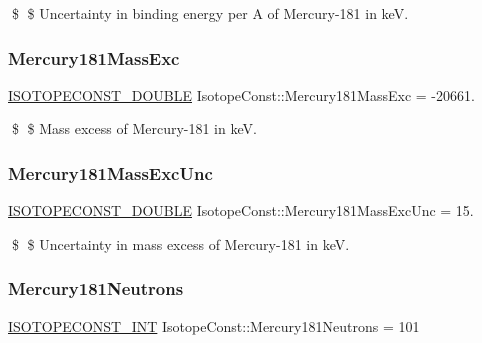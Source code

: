 \$ \$ Uncertainty in binding energy per A of Mercury-\/181 in keV. \mbox{\label{group___isotope_const-_mercury-_hg181_ga95e3cd076af0f7a54449aa435fa737fd}} 
\subsubsection{\texorpdfstring{Mercury181\+Mass\+Exc}{Mercury181MassExc}}
{\footnotesize\ttfamily \mbox{\hyperlink{group___isotope_const-_macros_ga8f45a7272ce02c0b4c65c44636ed719a}{I\+S\+O\+T\+O\+P\+E\+C\+O\+N\+S\+T\+\_\+\+D\+O\+U\+B\+LE}} Isotope\+Const\+::\+Mercury181\+Mass\+Exc = -\/20661.}

\$ \$ Mass excess of Mercury-\/181 in keV. \mbox{\label{group___isotope_const-_mercury-_hg181_ga0dc5e1d1fc487cfa753232dce766a844}} 
\subsubsection{\texorpdfstring{Mercury181\+Mass\+Exc\+Unc}{Mercury181MassExcUnc}}
{\footnotesize\ttfamily \mbox{\hyperlink{group___isotope_const-_macros_ga8f45a7272ce02c0b4c65c44636ed719a}{I\+S\+O\+T\+O\+P\+E\+C\+O\+N\+S\+T\+\_\+\+D\+O\+U\+B\+LE}} Isotope\+Const\+::\+Mercury181\+Mass\+Exc\+Unc = 15.}

\$ \$ Uncertainty in mass excess of Mercury-\/181 in keV. \mbox{\label{group___isotope_const-_mercury-_hg181_ga58eda58c935725c84c7f44cc582a184b}} 
\subsubsection{\texorpdfstring{Mercury181\+Neutrons}{Mercury181Neutrons}}
{\footnotesize\ttfamily \mbox{\hyperlink{group___isotope_const-_macros_ga5f18360b3e99483a35c32d789e62621c}{I\+S\+O\+T\+O\+P\+E\+C\+O\+N\+S\+T\+\_\+\+I\+NT}} Isotope\+Const\+::\+Mercury181\+Neutrons = 101}

